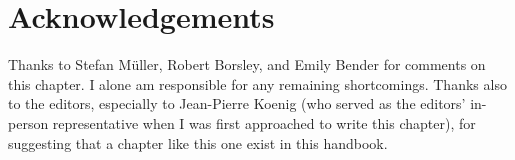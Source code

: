 \documentclass[output=paper
                ,modfonts
                ,nonflat
	        ,collection
	        ,collectionchapter
	        ,collectiontoclongg
 	        ,biblatex
                ,babelshorthands
                ,newtxmath
                ,draftmode
                ,colorlinks, citecolor=brown
]{./langsci/langscibook}
\begin{document}
{\section*{Acknowledgements}

Thanks to Stefan M{\"u}ller, Robert Borsley, and Emily Bender for comments on this chapter. I alone am responsible for any remaining shortcomings. Thanks also to the editors, especially to Jean-Pierre Koenig (who served as the editors' in-person representative when I was first approached to write this chapter), for suggesting that a chapter like this one exist in this handbook.  
 
}

{\sloppy

\printbibliography[heading=subbibliography,notkeyword=this]
}
\end{document}
